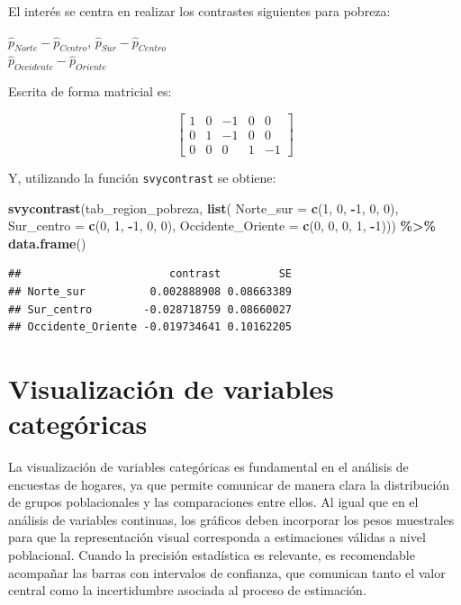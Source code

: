 \documentclass[
  spanish,
  12pt,
]{book}
\newenvironment{Shaded}{\begin{snugshade}}{\end{snugshade}}
\newcommand{\AttributeTok}[1]{\textcolor[rgb]{0.13,0.29,0.53}{#1}}
\newcommand{\DecValTok}[1]{\textcolor[rgb]{0.00,0.00,0.81}{#1}}
\newcommand{\FunctionTok}[1]{\textcolor[rgb]{0.13,0.29,0.53}{\textbf{#1}}}
\newcommand{\NormalTok}[1]{#1}
\newcommand{\SpecialCharTok}[1]{\textcolor[rgb]{0.81,0.36,0.00}{\textbf{#1}}}
\begin{document}
El interés se centra en realizar los contrastes siguientes para pobreza:

\(\hat{p}_{Norte} - \hat{p}_{Centro}\),
\(\hat{p}_{Sur}-\hat{p}_{Centro}\)\\
\(\hat{p}_{Occidente}-\hat{p}_{Oriente}\)

Escrita de forma matricial es:

\[
\left[\begin{array}{ccccc}
1 & 0 & -1 & 0 & 0\\
0 & 1 & -1 & 0 & 0\\
0 & 0 & 0 & 1 & -1
\end{array}\right]
\]

Y, utilizando la función \texttt{svycontrast} se obtiene:

\begin{Shaded}
\begin{Highlighting}[]
\FunctionTok{svycontrast}\NormalTok{(tab\_region\_pobreza, }\FunctionTok{list}\NormalTok{(}
                \AttributeTok{Norte\_sur =} \FunctionTok{c}\NormalTok{(}\DecValTok{1}\NormalTok{, }\DecValTok{0}\NormalTok{, }\SpecialCharTok{{-}}\DecValTok{1}\NormalTok{, }\DecValTok{0}\NormalTok{, }\DecValTok{0}\NormalTok{),}
                \AttributeTok{Sur\_centro =} \FunctionTok{c}\NormalTok{(}\DecValTok{0}\NormalTok{, }\DecValTok{1}\NormalTok{, }\SpecialCharTok{{-}}\DecValTok{1}\NormalTok{, }\DecValTok{0}\NormalTok{, }\DecValTok{0}\NormalTok{),}
                \AttributeTok{Occidente\_Oriente =} \FunctionTok{c}\NormalTok{(}\DecValTok{0}\NormalTok{, }\DecValTok{0}\NormalTok{, }\DecValTok{0}\NormalTok{, }\DecValTok{1}\NormalTok{, }\SpecialCharTok{{-}}\DecValTok{1}\NormalTok{))) }\SpecialCharTok{\%\textgreater{}\%} \FunctionTok{data.frame}\NormalTok{()}
\end{Highlighting}
\end{Shaded}

\begin{verbatim}
##                       contrast         SE
## Norte_sur          0.002888908 0.08663389
## Sur_centro        -0.028718759 0.08660027
## Occidente_Oriente -0.019734641 0.10162205
\end{verbatim}

\section{Visualización de variables categóricas}\label{viz-categoricas}

La visualización de variables categóricas es fundamental en el análisis de encuestas de hogares, ya que permite comunicar de manera clara la distribución de grupos poblacionales y las comparaciones entre ellos. Al igual que en el análisis de variables continuas, los gráficos deben incorporar los pesos muestrales para que la representación visual corresponda a estimaciones válidas a nivel poblacional. Cuando la precisión estadística es relevante, es recomendable acompañar las barras con intervalos de confianza, que comunican tanto el valor central como la incertidumbre asociada al proceso de estimación.
\end{document}
